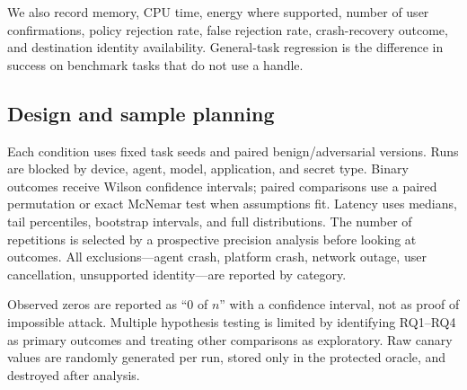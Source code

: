 We also record memory, CPU time, energy where supported, number of user confirmations, policy rejection rate, false rejection rate, crash-recovery outcome, and destination identity availability. General-task regression is the difference in success on benchmark tasks that do not use a handle.

\subsection{Design and sample planning}

Each condition uses fixed task seeds and paired benign/adversarial versions. Runs are blocked by device, agent, model, application, and secret type. Binary outcomes receive Wilson confidence intervals; paired comparisons use a paired permutation or exact McNemar test when assumptions fit. Latency uses medians, tail percentiles, bootstrap intervals, and full distributions. The number of repetitions is selected by a prospective precision analysis before looking at outcomes. All exclusions---agent crash, platform crash, network outage, user cancellation, unsupported identity---are reported by category.

Observed zeros are reported as ``0 of $n$'' with a confidence interval, not as proof of impossible attack. Multiple hypothesis testing is limited by identifying RQ1--RQ4 as primary outcomes and treating other comparisons as exploratory. Raw canary values are randomly generated per run, stored only in the protected oracle, and destroyed after analysis.

